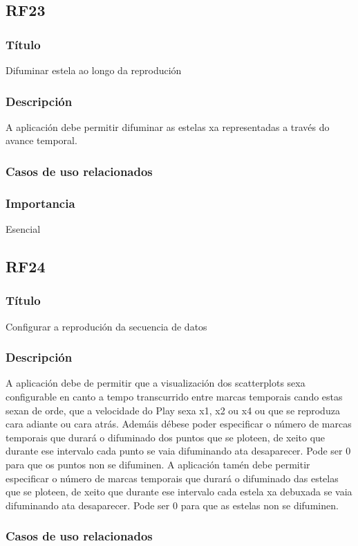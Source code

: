 \subsection{RF23}
\subsubsection{Título}
Difuminar estela ao longo da reprodución
\subsubsection{Descripción}
A aplicación debe permitir difuminar as estelas xa representadas a través do avance temporal.
\subsubsection{Casos de uso relacionados}
\subsubsection{Importancia}
Esencial

\subsection{RF24}
\subsubsection{Título}
Configurar a reprodución da secuencia de datos
\subsubsection{Descripción}
A aplicación debe de permitir que a visualización dos scatterplots sexa configurable en canto a tempo transcurrido entre marcas temporais cando estas sexan de orde, que a velocidade do Play sexa x1, x2 ou x4 ou que se reproduza cara adiante ou cara atrás. Ademáis débese poder especificar o número de marcas temporais que durará o difuminado dos puntos que se ploteen, de xeito que durante ese intervalo cada punto se vaia difuminando ata desaparecer. Pode ser  0 para que os puntos non se difuminen. A aplicación tamén debe permitir especificar o número de marcas temporais que durará o difuminado das estelas que se ploteen, de xeito que durante ese intervalo cada estela xa debuxada se vaia difuminando ata desaparecer. Pode ser 0 para que as estelas non se difuminen.
\subsubsection{Casos de uso relacionados}
